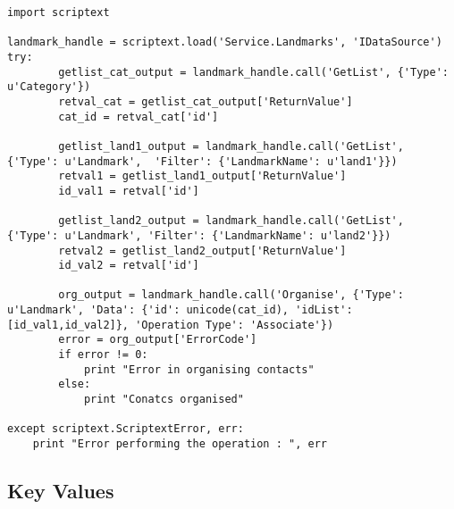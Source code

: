\begin{verbatim}
import scriptext

landmark_handle = scriptext.load('Service.Landmarks', 'IDataSource')
try:
		getlist_cat_output = landmark_handle.call('GetList', {'Type': u'Category'})
		retval_cat = getlist_cat_output['ReturnValue']
		cat_id = retval_cat['id']

		getlist_land1_output = landmark_handle.call('GetList', {'Type': u'Landmark',  'Filter': {'LandmarkName': u'land1'}})
		retval1 = getlist_land1_output['ReturnValue']
		id_val1 = retval['id']

		getlist_land2_output = landmark_handle.call('GetList', {'Type': u'Landmark', 'Filter': {'LandmarkName': u'land2'}})
		retval2 = getlist_land2_output['ReturnValue']
		id_val2 = retval['id']

		org_output = landmark_handle.call('Organise', {'Type': u'Landmark', 'Data': {'id': unicode(cat_id), 'idList': [id_val1,id_val2]}, 'Operation Type': 'Associate'})
		error = org_output['ErrorCode']
		if error != 0:
			print "Error in organising contacts"
		else:
			print "Conatcs organised"

except scriptext.ScriptextError, err:
    print "Error performing the operation : ", err
\end{verbatim}

\subsection{Key Values}
\label{subsec:landmarkkeyval}


